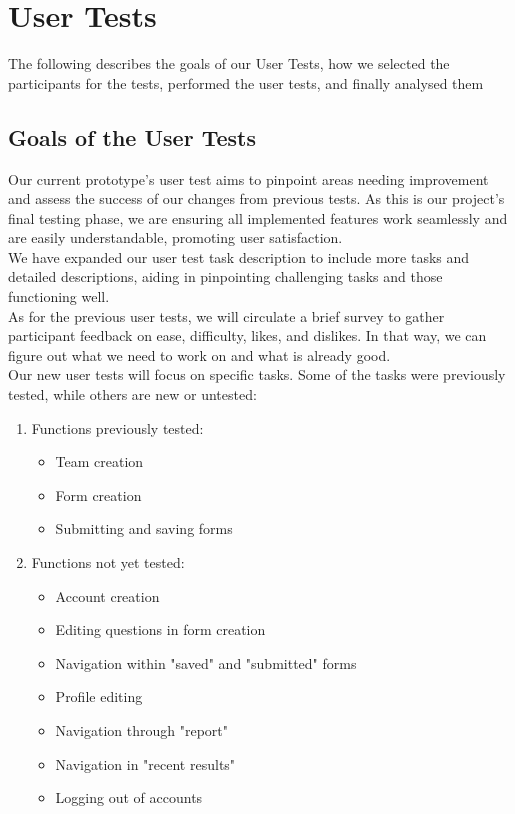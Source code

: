 \documentclass[11pt]{article}
\begin{document}
\clearpage

\section{User Tests}
The following describes the goals of our User Tests, how we selected the participants for
the tests, performed the user tests, and finally analysed them

\subsection{Goals of the User Tests}
Our current prototype's user test aims to pinpoint areas needing improvement and assess the success of our changes from previous tests. As this is our project's final testing phase, we are ensuring all implemented features work seamlessly and are easily understandable, promoting user satisfaction. \\
We have expanded our user test task description to include more tasks and detailed descriptions, aiding in pinpointing challenging tasks and those functioning well. \\
As for the previous user tests, we will circulate a brief survey to gather participant feedback on ease, difficulty, likes, and dislikes. In that way, we can figure out what we need to work on and what is already good.\\
Our new user tests will focus on specific tasks. Some of the tasks were previously tested, while others are new or untested:

\begin{enumerate}

    \item Functions previously tested:
    \begin{itemize}
        \item Team creation
        \item Form creation
        \item Submitting and saving forms
    \end{itemize}

    \item Functions not yet tested: 
    \begin{itemize}
        \item Account creation
        \item Editing questions in form creation
        \item Navigation within "saved" and "submitted" forms
        \item Profile editing
        \item Navigation through "report"
        \item Navigation in "recent results"
        \item Logging out of accounts
    \end{itemize}
    
\end{enumerate}
\end{document}
